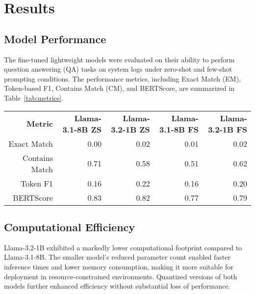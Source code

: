 \documentclass[11pt]{article}
\begin{document}
\section{Results}
\subsection{Model Performance}
The fine-tuned lightweight models were evaluated on their ability to perform question answering (QA) tasks on system logs under zero-shot and few-shot prompting conditions. The performance metrics, including Exact Match (EM), Token-based F1, Contains Match (CM), and BERTScore, are summarized in Table~\ref{tab:metrics}.

\begin{table*}[]
\centering

{
\begin{tabular}{r|r|r|r|r}

\textbf{Metric}        & \textbf{Llama-3.1-8B ZS} & \textbf{Llama-3.2-1B ZS} & \textbf{Llama-3.1-8B FS} & \textbf{Llama-3.2-1B FS} \\ 

Exact Match            & 0.00                    & 0.02                    & 0.01                    & 0.02                    \\ 
Contains Match         & 0.71                    & 0.58                    & 0.51                    & 0.62                    \\ 
Token F1               & 0.16                    & 0.22                    & 0.16                    & 0.20                    \\ 
BERTScore              & 0.83                    & 0.82                    & 0.77                    & 0.79                    \\ 

\end{tabular}
}
\caption{Performance metrics for lightweight large language models (LLMs) in zero-shot (ZS) and few-shot (FS) configurations.}
\label{tab:metrics}
\end{table*}

\subsection{Computational Efficiency}
Llama-3.2-1B exhibited a markedly lower computational footprint compared to Llama-3.1-8B. The smaller model's reduced parameter count enabled faster inference times and lower memory consumption, making it more suitable for deployment in resource-constrained environments. Quantized versions of both models further enhanced efficiency without substantial loss of performance.
\end{document}
